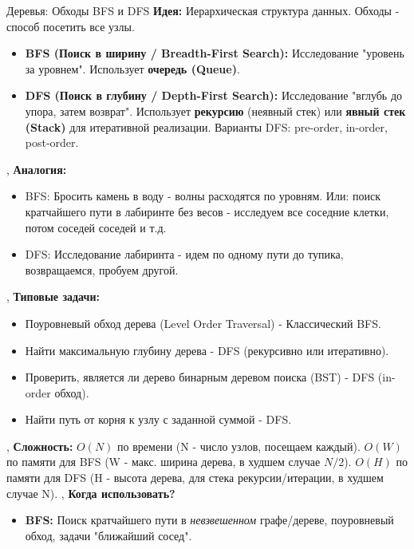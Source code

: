 \begin{textbox}{Деревья: Обходы BFS и DFS}
    \textbf{Идея:} Иерархическая структура данных. Обходы - способ посетить все узлы.
    \begin{itemize}[nosep, leftmargin=*]
        \item \textbf{BFS (Поиск в ширину / Breadth-First Search):} Исследование "уровень за уровнем". Использует \textbf{очередь (Queue)}.
        \item \textbf{DFS (Поиск в глубину / Depth-First Search):} Исследование "вглубь до упора, затем возврат". Использует \textbf{рекурсию} (неявный стек) или \textbf{явный стек (Stack)} для итеративной реализации. Варианты DFS: pre-order, in-order, post-order.
    \end{itemize} \sep
    \textbf{Аналогия:}
    \begin{itemize}[nosep, leftmargin=*]
        \item BFS: Бросить камень в воду - волны расходятся по уровням. Или: поиск кратчайшего пути в лабиринте без весов - исследуем все соседние клетки, потом соседей соседей и т.д.
        \item DFS: Исследование лабиринта - идем по одному пути до тупика, возвращаемся, пробуем другой.
    \end{itemize} \sep
    \textbf{Типовые задачи:}
    \begin{itemize}[nosep, leftmargin=*]
        \item Поуровневый обход дерева (Level Order Traversal) - Классический BFS.
        \item Найти максимальную глубину дерева - DFS (рекурсивно или итеративно).
        \item Проверить, является ли дерево бинарным деревом поиска (BST) - DFS (in-order обход).
        \item Найти путь от корня к узлу с заданной суммой - DFS.
    \end{itemize} \sep
    \textbf{Сложность:} \textbf{$O(N)$} по времени (N - число узлов, посещаем каждый). \textbf{$O(W)$} по памяти для BFS (W - макс. ширина дерева, в худшем случае $N/2$). \textbf{$O(H)$} по памяти для DFS (H - высота дерева, для стека рекурсии/итерации, в худшем случае N). \sep %
    \textbf{Когда использовать?}
    \begin{itemize}[nosep, leftmargin=*]
        \item \textbf{BFS:} Поиск кратчайшего пути в \textit{невзвешенном} графе/дереве, поуровневый обход, задачи "ближайший сосед".

\end{itemize}
\end{textbox}
